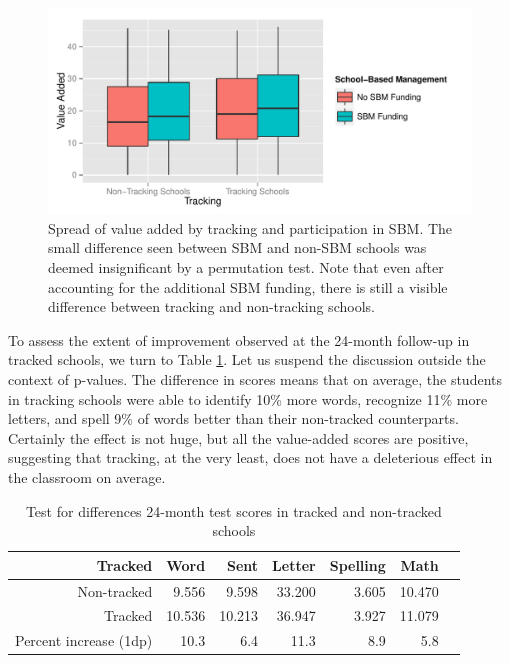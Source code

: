 \documentclass[11pt]{article}
\begin{document}
  \begin{figure}[H]
  	\centering
  	\includegraphics[scale=0.8]{../Figures/ValueAddedTrackSBM.pdf}
  	\caption{Spread of value added by tracking and participation in SBM. The small difference seen between SBM and non-SBM schools was deemed insignificant by a permutation test.  Note that even after accounting for the additional SBM funding, there is still a visible difference between tracking and non-tracking schools.}
  	\label{fig:ValueAddedTrackSBM}
  \end{figure} 

To assess the extent of improvement observed at the 24-month follow-up in tracked schools, we turn to Table \ref{tab:practical}. Let us suspend the discussion outside the context of p-values. The difference in scores means that on average, the students in tracking schools were able to identify 10\% more words, recognize 11\% more letters, and spell 9\% of words better than their non-tracked counterparts. Certainly the effect is not huge, but all the value-added scores are positive, suggesting that tracking, at the very least, does not have a deleterious effect in the classroom on average.


\begin{table}[ht]
	\centering
	\begin{tabular}{rrrrrrr}
		\hline
		Tracked & Word & Sent & Letter & Spelling & Math \\ 
		\hline
		 Non-tracked & 9.556 & 9.598 & 33.200 & 3.605 & 10.470 \\ 
		 Tracked & 10.536 & 10.213 & 36.947 & 3.927 & 11.079 \\ 
		\hline
		Percent increase (1dp) & 10.3 & 6.4 & 11.3 & 8.9 & 5.8\\
		\hline
	\end{tabular}
	\caption{Test for differences 24-month test scores in tracked and non-tracked schools} 
	\label{tab:practical}
\end{table}
\end{document}
